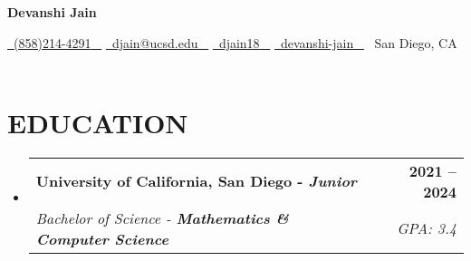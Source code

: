 \documentclass[letterpaper,11pt]{article}
\makeatletter
\newcommand{\resumeSubheading}[4]{
  \vspace{-2pt}\item
    \begin{tabular*}{1.0\textwidth}[t]{l@{\extracolsep{\fill}}r}
      \textbf{\large#1} & \textbf{\small #2} \\
      \textit{\large#3} & \textit{\small #4} \\
      
    \end{tabular*}\vspace{-7pt}
}
\newcommand{\resumeSubHeadingListStart}{\begin{itemize}[leftmargin=0.0in, label={}]}
\newcommand{\resumeSubHeadingListEnd}{\end{itemize}}
\makeatother
\begin{document}

    

{\Huge \textbf{Devanshi Jain}} \\
\vspace{1pt}

\begin{center}
    \small 
    \href{tel:+1(858)214-4291}{\faPhone\ {(858)214-4291} ~} 
    \href{mailto:djain@ucsd.edu}{\faEnvelope\  \underline{djain@ucsd.edu} ~} 
    \href{https://linkedin.com/in/djain18}{\faLinkedin\ \underline{djain18} ~}
    \href{https://github.com/devanshi-jain}{\faGithub\ \underline{devanshi-jain} ~}
    {\faMapMarker\  {San Diego, CA}} ~ 
\end{center}


\section{EDUCATION}
  \resumeSubHeadingListStart
    \resumeSubheading
      {University of California, San Diego - \textit{\textbf{Junior}}}{2021 -- 2024}
      {Bachelor of Science - \textbf{Mathematics \& Computer Science}}{GPA: 3.4}
  \resumeSubHeadingListEnd
  
\end{document}
